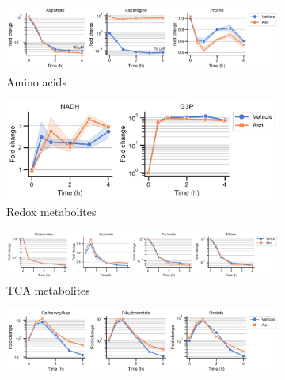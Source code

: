 \begin{figure}[!ht]
    \captionsetup{labelformat=empty}
    \centering
    \begin{subfigure}[b]{0.68\textwidth}
        \includegraphics[width=\textwidth]{figures/sapp/GOT_DKO_Asp_depl/HT1080_DKO_AA.pdf}
        \caption{Amino acids}
        \label{fig:sapp:GOT_DKO_Asp_depl:HT1080_DKO_AA}
    \end{subfigure}
    \hfill
    \begin{subfigure}[b]{0.45\textwidth}
        \includegraphics[width=\textwidth]{figures/sapp/GOT_DKO_Asp_depl/HT1080_DKO_rd.pdf}
        \caption{Redox metabolites}
        \label{fig:sapp:GOT_DKO_Asp_depl:HT1080_DKO_rd}
    \end{subfigure}
    \hfill
    \begin{subfigure}[b]{0.9\textwidth}
        \includegraphics[width=\textwidth]{figures/sapp/GOT_DKO_Asp_depl/HT1080_DKO_tca.pdf}
        \caption{TCA metabolites}
        \label{fig:sapp:GOT_DKO_Asp_depl:HT1080_DKO_tca}
    \end{subfigure}
    \hfill
    \begin{subfigure}[b]{0.68\textwidth}
        \includegraphics[width=\textwidth]{figures/sapp/GOT_DKO_Asp_depl/HT1080_DKO_pyr.pdf}

\end{subfigure}
\end{figure}
